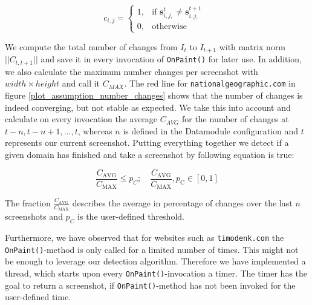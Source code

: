 \[
c_{i,j} =
\begin{cases}
1,& \text{if $\mathbf{s}^{t}_{i,j,} \neq \mathbf{s}^{t+1}_{i,j,}$ } \\
0,              & \text{otherwise}
\end{cases}
\]

We compute the total number of changes from $I_{t}$ to $I_{t+1}$ with matrix norm $|| C_{t,t+1}||$ and save it in every invocation of \texttt{OnPaint()} for later use. In addition, we also calculate the maximum number changes per screenshot with $width \times height$ and call it $C_{MAX}$. The red line for \texttt{nationalgeographic.com} in figure \ref{plot_assumption_number_changes} shows that the number of changes is indeed converging, but not stable as expected. We take this into account and calculate on every invocation the average $C_{AVG}$ for the number of changes at $t-n, t-n+1, ..., t$, whereas $n$ is defined in the Datamodule configuration and $t$ represents our current screenshot. Putting everything together we detect if a given domain has finished and take a screenshot by following equation is true:

\[
{\frac{C_{\text{AVG}}}{C_{\text{MAX}}} \leq p_{C}; \quad   {\frac{C_{\text{AVG}}}{C_{\text{MAX}}}}, p_{\text{C}} \in [0,1]}
\]

The fraction ${\frac{C_{\text{AVG}}}{C_{\text{MAX}}}}$ describes the average in percentage of changes over the last $n$ screenshots and $p_{C}$ is the user-defined threshold. 

Furthermore, we have observed that for websites such as \texttt{timodenk.com} the \texttt{OnPaint()}-method is only called for a limited number of times. This might not be enough to leverage our detection algorithm. Therefore we have implemented a thread, which starts upon every \texttt{OnPaint()}-invocation a timer. The timer has the goal to return a screenshot, if \texttt{OnPaint()}-method has not been invoked for the user-defined time.  

